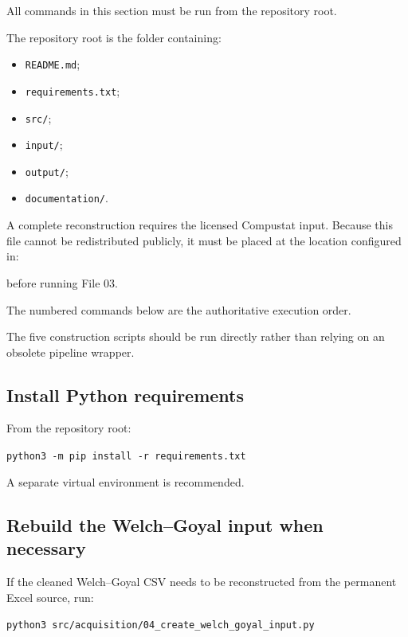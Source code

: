 \documentclass[11pt,a4paper]{article}
\newcommand{\code}[1]{\texttt{#1}}
\begin{document}
All commands in this section must be run from the repository root.

The repository root is the folder containing:

\begin{itemize}
  \item \code{README.md};
  \item \code{requirements.txt};
  \item \code{src/};
  \item \code{input/};
  \item \code{output/};
  \item \code{documentation/}.
\end{itemize}

A complete reconstruction requires the licensed Compustat input. Because this
file cannot be redistributed publicly, it must be placed at the location
configured in:

\begin{center}
\end{center}

before running File 03.

The numbered commands below are the authoritative execution order.

The five construction scripts should be run directly rather than relying on an
obsolete pipeline wrapper.

\subsection{Install Python requirements}

From the repository root:

\begin{center}
\code{python3 -m pip install -r requirements.txt}
\end{center}

A separate virtual environment is recommended.

\subsection{Rebuild the Welch--Goyal input when necessary}

If the cleaned Welch--Goyal CSV needs to be reconstructed from the permanent
Excel source, run:

\begin{center}
\code{python3 src/acquisition/04\_create\_welch\_goyal\_input.py}
\end{center}
\end{document}

